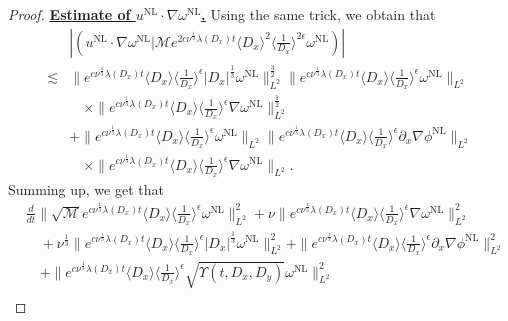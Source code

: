 \documentclass[reqno, 12pt]{amsart} %
\theoremstyle{plain} %
\theoremstyle{definition}
\theoremstyle{remark}
\numberwithin{equation}{section} %
\newcommand{\px}{\partial_x}
\begin{document}
\begin{proof}
		
		\underline{\bf Estimate of $   u^{\mathrm{NL}} \cdot  \nabla \omega^{\mathrm{NL}}$.} Using the same trick, we obtain that
		\begin{equation*}\begin{aligned}
				&\left|\left(  u^{\mathrm{NL}} \cdot \nabla \omega^{\mathrm{NL}} \big| \mathcal{M} e^{2 c \nu^{\frac{1}{3}} \lambda\left(D_x\right) t}\langle D_x\rangle^2\langle\frac{1}{D_x}\rangle^{2 \epsilon} \omega^{\mathrm{NL}} \right)\right| \\
				\lesssim& \|e^{c \nu^{\frac{1}{3}} \lambda\left(D_x\right) t}\langle D_x\rangle    \langle \frac{1}{D_x}\rangle^\epsilon  \left|D_x\right|^{\frac{1}{3}}\omega^{\mathrm{NL}}\|_{L^2}^\frac32 \|e^{c \nu^{\frac{1}{3}} \lambda\left(D_x\right) t}\langle D_x\rangle\langle\frac{1}{D_x}\rangle^\epsilon \omega^{\mathrm{NL}}\|_{L^2} \\
				& \quad \times\|e^{c \nu^{\frac{1}{3}} \lambda\left(D_x\right) t}\langle D_x\rangle\langle\frac{1}{D_x}\rangle^\epsilon \nabla  \omega^{\mathrm{NL}}\|_{L^2}^\frac12 \\
				&+ \|e^{c \nu^{\frac{1}{3}} \lambda\left(D_x\right) t}\langle D_x\rangle    \langle \frac{1}{D_x}\rangle^\epsilon  \omega^{\mathrm{NL}}\|_{L^2} \|e^{c \nu^{\frac{1}{3}} \lambda\left(D_x\right) t}\langle D_x\rangle\langle\frac{1}{D_x}\rangle^\epsilon \px \nabla \phi^{\mathrm{NL}}\|_{L^2} \\
				& \quad \times\|e^{c \nu^{\frac{1}{3}} \lambda\left(D_x\right) t}\langle D_x\rangle\langle\frac{1}{D_x}\rangle^\epsilon \nabla \omega^{\mathrm{NL}}\|_{L^2}.
		\end{aligned}\end{equation*}
		Summing up, we get that
		\footnotesize{	\begin{align*}
				& \frac{d}{d t}\| \sqrt{\mathcal{M}}  e^{c \nu^{\frac{1}{3}} \lambda\left(D_x\right) t}\langle D_x\rangle\langle\frac{1}{D_x}\rangle^\epsilon \omega^{\mathrm{NL}}\|_{L^2}^2+\nu\|e^{c \nu^{\frac{1}{3}} \lambda\left(D_x\right) t}\langle D_x\rangle\langle\frac{1}{D_x}\rangle^\epsilon \nabla \omega^{\mathrm{NL}}\|_{L^2}^2 \\
				& \quad+ \nu^{\frac{1}{3}}\|e^{c \nu^{\frac{1}{3}} \lambda\left(D_x\right) t}\langle D_x\rangle\langle\frac{1}{D_x}\rangle^\epsilon\left|D_x\right|^{\frac{1}{3}}  \omega^{\mathrm{NL}}\|_{L^2}^2  + \|e^{c \nu^{\frac{1}{3}} \lambda\left(D_x\right) t}\langle D_x\rangle\langle\frac{1}{D_x}\rangle^\epsilon \partial_x \nabla \phi^{\mathrm{NL}}\|_{L^2}^2
				\\
				& \quad+\|e^{c \nu^{\frac{1}{3}} \lambda\left(D_x\right) t}\langle D_x\rangle\langle\frac{1}{D_x}\rangle^\epsilon \sqrt{\Upsilon\left(t, D_x, D_y\right)} \omega^{\mathrm{NL}}\|_{L^2}^2 \\

\end{align*}}
\end{proof}
\end{document}
